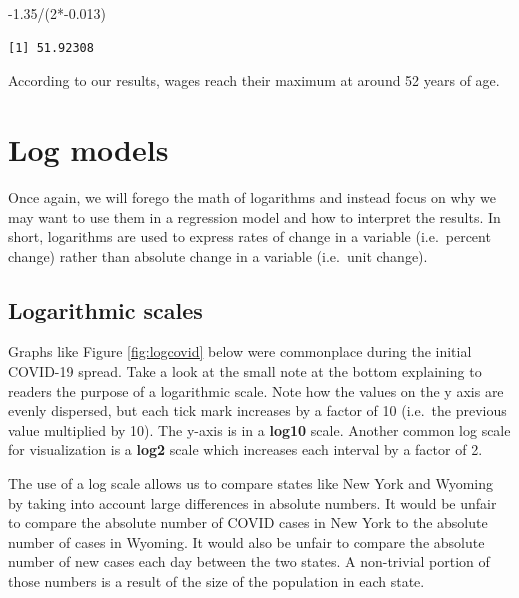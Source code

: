 \documentclass[
]{book}
\makeatletter
\newenvironment{Shaded}{\begin{snugshade}}{\end{snugshade}}
\newcommand{\DecValTok}[1]{\textcolor[rgb]{0.06,0.06,0.06}{#1}}
\newcommand{\FloatTok}[1]{\textcolor[rgb]{0.06,0.06,0.06}{#1}}
\newcommand{\NormalTok}[1]{#1}
\newcommand{\SpecialCharTok}[1]{\textcolor[rgb]{0,0,0}{#1}}
\newenvironment{kframe}{%
\medskip{}
\setlength{\fboxsep}{.8em}
 \def\at@end@of@kframe{}%
 \ifinner\ifhmode%
  \def\at@end@of@kframe{\end{minipage}}%
  \begin{minipage}{\columnwidth}%
 \fi\fi%
 \def\FrameCommand##1{\hskip\@totalleftmargin \hskip-\fboxsep
 \colorbox{shadecolor}{##1}\hskip-\fboxsep
     \hskip-\linewidth \hskip-\@totalleftmargin \hskip\columnwidth}%
 \MakeFramed {\advance\hsize-\width
   \@totalleftmargin\z@ \linewidth\hsize
   \@setminipage}}%
 {\par\unskip\endMakeFramed%
 \at@end@of@kframe}
\renewenvironment{Shaded}{\begin{kframe}}{\end{kframe}}
\makeatother
\begin{document}
\begin{Shaded}
\begin{Highlighting}[]
\SpecialCharTok{{-}}\FloatTok{1.35}\SpecialCharTok{/}\NormalTok{(}\DecValTok{2}\SpecialCharTok{*{-}}\FloatTok{0.013}\NormalTok{)}
\end{Highlighting}
\end{Shaded}

\begin{verbatim}
[1] 51.92308
\end{verbatim}

According to our results, wages reach their maximum at around 52 years of age.

\hypertarget{log-models}{%
\section{Log models}\label{log-models}}

Once again, we will forego the math of logarithms and instead focus on why we may want to use them in a regression model and how to interpret the results. In short, logarithms are used to express rates of change in a variable (i.e.~percent change) rather than absolute change in a variable (i.e.~unit change).

\hypertarget{logarithmic-scales}{%
\subsection{Logarithmic scales}\label{logarithmic-scales}}

Graphs like Figure \ref{fig:logcovid} below were commonplace during the initial COVID-19 spread. Take a look at the small note at the bottom explaining to readers the purpose of a logarithmic scale. Note how the values on the y axis are evenly dispersed, but each tick mark increases by a factor of 10 (i.e.~the previous value multiplied by 10). The y-axis is in a \textbf{log10} scale. Another common log scale for visualization is a \textbf{log2} scale which increases each interval by a factor of 2.

The use of a log scale allows us to compare states like New York and Wyoming by taking into account large differences in absolute numbers. It would be unfair to compare the absolute number of COVID cases in New York to the absolute number of cases in Wyoming. It would also be unfair to compare the absolute number of new cases each day between the two states. A non-trivial portion of those numbers is a result of the size of the population in each state.
\end{document}
